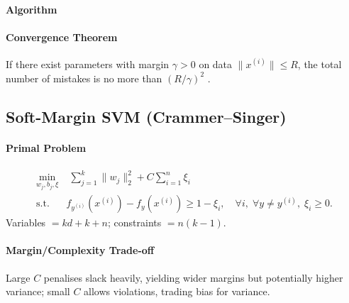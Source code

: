 \documentclass{article}
\begin{document}
\paragraph{Algorithm}
\paragraph{Convergence Theorem}
If there exist parameters with margin $\gamma>0$ on data
$\|x^{(i)}\|\le R$, the total number of mistakes is
no more than $(R/\gamma)^{2}$ \cite{crammer2003}.

\subsection{Soft-Margin SVM (Crammer--Singer)}
\paragraph{Primal Problem}
\begin{align}
\min_{w_{j},b_{j},\xi}
&\;
\sum_{j=1}^{k}\|w_{j}\|_{2}^{2} + C\sum_{i=1}^{n}\xi_{i}
\\
\text{s.t. }&
f_{y^{(i)}}(x^{(i)})-f_{y}(x^{(i)})\ge 1-\xi_{i},
\quad
\forall i,\; \forall y\neq y^{(i)},\;
\xi_{i}\ge 0.
\nonumber
\end{align}
Variables $=kd+k+n$;
constraints $=n(k-1)$.
\paragraph{Margin/Complexity Trade-off}
Large $C$ penalises slack heavily,
yielding wider margins but potentially higher variance;
small $C$ allows violations, trading bias for variance.
\end{document}
